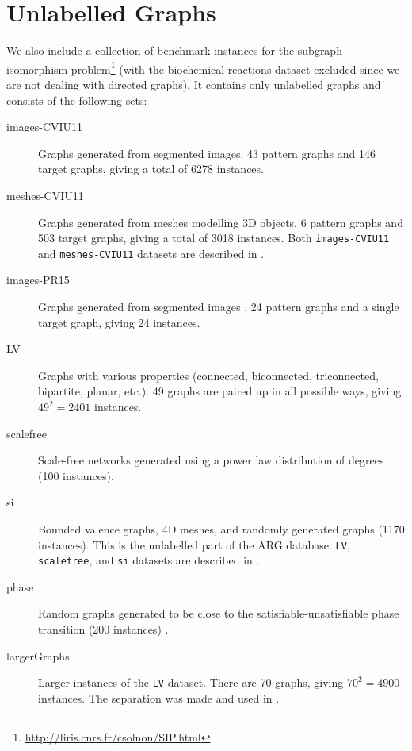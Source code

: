 \documentclass{l4proj}
\theoremstyle{definition}
\theoremstyle{remark}
\begin{document}
\section{Unlabelled Graphs} \label{sec:unlabelled}
We also include a collection of benchmark instances for the subgraph isomorphism
problem\footnote{\url{http://liris.cnrs.fr/csolnon/SIP.html}} (with the
biochemical reactions dataset excluded since we are not dealing with directed
graphs). It contains only unlabelled graphs and consists of the following sets:

\begin{description}
\item[images-CVIU11] Graphs generated from segmented images. 43 pattern graphs
  and 146 target graphs, giving a total of \num{6278} instances.
\item[meshes-CVIU11] Graphs generated from meshes modelling 3D
  objects. 6 pattern graphs and 503 target graphs, giving a total of \num{3018}
  instances. Both \texttt{images-CVIU11} and \texttt{meshes-CVIU11} datasets are
  described in \cite{DBLP:journals/cviu/DamiandSHJS11}.
\item[images-PR15] Graphs generated from segmented images
  \cite{DBLP:journals/pr/SolnonDHJ15}. 24 pattern graphs and a single target
  graph, giving 24 instances.
\item[LV] Graphs with various properties (connected, biconnected, triconnected,
  bipartite, planar, etc.). 49 graphs are paired up in all possible ways, giving
  $49^2=\num{2401}$ instances.
\item[scalefree] Scale-free networks generated using a power law distribution of
  degrees (100 instances).
\item[si] Bounded valence graphs, 4D meshes, and randomly generated graphs
  (\num{1170} instances). This is the unlabelled part of the ARG database.
  \texttt{LV}, \texttt{scalefree}, and \texttt{si} datasets are described in
  \cite{DBLP:journals/ai/Solnon10, DBLP:journals/constraints/ZampelliDS10}.
\item[phase] Random graphs generated to be close to the
  satisfiable-unsatisfiable phase transition (200 instances)
  \cite{DBLP:conf/ijcai/McCreeshPT16}.
\item[largerGraphs] Larger instances of the \texttt{LV} dataset. There are 70
  graphs, giving $70^2=\num{4900}$ instances. The separation was made and used
  in \cite{DBLP:conf/aaai/HoffmannMR17, DBLP:conf/lion/KotthoffMS16,
    DBLP:conf/ijcai/McCreeshPT17}.
\end{description}
\end{document}
